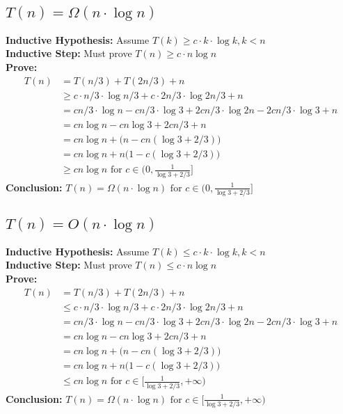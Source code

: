 \documentclass[a4paper]{article}
\begin{document}
\subsection{$T(n)= \Omega(n\cdot \log n)$}

\textbf{Inductive Hypothesis:} Assume $T(k)\geq c\cdot k \cdot \log{k}, k< n$\\
\textbf{Inductive Step:} Must prove $T(n)\geq c\cdot n\log{n}$\\
\textbf{Prove:}
\begin{align*}
    T(n) & = T(n/3) + T(2n/3) + n \\
    & \geq c\cdot n/3 \cdot \log{n/3} + c\cdot 2n/3 \cdot \log{2n/3} +n \\ 
    & = cn/3 \cdot \log{n} - cn/3 \cdot \log{3} + 2cn/3 \cdot \log{2n} - 2cn/3 \cdot \log{3} +n \\
    & = cn \log n - cn\log 3 + 2cn/3 + n \\
    & = cn \log n +\bigl(n-cn(\log 3 + 2/3)\bigr) \\
    & = cn \log n +n\bigl(1-c(\log 3 + 2/3)\bigr) \\
    & \geq cn \log n \text{ for } c\in (0,\frac{1}{\log 3 + 2/3}]
\end{align*}
\textbf{Conclusion: }$T(n)= \Omega(n\cdot \log n)\text{ for } c\in (0,\frac{1}{\log 3 + 2/3}] $

\subsection{$T(n)= O(n\cdot \log n)$}

\textbf{Inductive Hypothesis:} Assume $T(k)\leq c\cdot k \cdot \log{k}, k< n$\\
\textbf{Inductive Step:} Must prove $T(n)\leq c\cdot n\log{n}$\\
\textbf{Prove:}
\begin{align*}
    T(n) & = T(n/3) + T(2n/3) + n \\
    & \leq c\cdot n/3 \cdot \log{n/3} + c\cdot 2n/3 \cdot \log{2n/3} +n \\ 
    & = cn/3 \cdot \log{n} - cn/3 \cdot \log{3} + 2cn/3 \cdot \log{2n} - 2cn/3 \cdot \log{3} +n \\
    & = cn \log n - cn\log 3 + 2cn/3 + n \\
    & = cn \log n +\bigl(n-cn(\log 3 + 2/3)\bigr) \\
    & = cn \log n +n\bigl(1-c(\log 3 + 2/3)\bigr) \\
    & \leq cn \log n \text{ for } c\in [\frac{1}{\log 3 + 2/3}, +\infty)
\end{align*}
\textbf{Conclusion: }$T(n)= \Omega(n\cdot \log n)\text{ for } c\in [\frac{1}{\log 3 + 2/3}, +\infty) $
\end{document}
